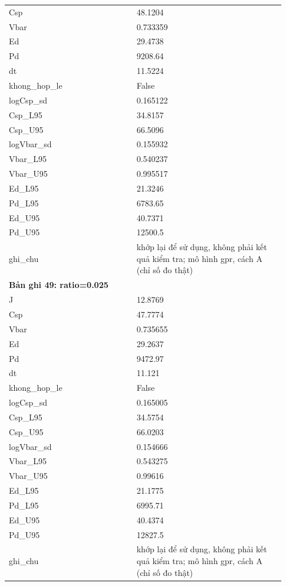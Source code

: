 \begin{longtable}{p{0.43\linewidth}p{0.50\linewidth}}
Csp & 48.1204 \\
Vbar & 0.733359 \\
Ed & 29.4738 \\
Pd & 9208.64 \\
dt & 11.5224 \\
khong\_\allowbreak hop\_\allowbreak le & False \\
logCsp\_\allowbreak sd & 0.165122 \\
Csp\_\allowbreak L95 & 34.8157 \\
Csp\_\allowbreak U95 & 66.5096 \\
logVbar\_\allowbreak sd & 0.155932 \\
Vbar\_\allowbreak L95 & 0.540237 \\
Vbar\_\allowbreak U95 & 0.995517 \\
Ed\_\allowbreak L95 & 21.3246 \\
Pd\_\allowbreak L95 & 6783.65 \\
Ed\_\allowbreak U95 & 40.7371 \\
Pd\_\allowbreak U95 & 12500.5 \\
ghi\_\allowbreak chu & khớp lại để sử dụng, không phải kết quả kiểm tra; mô hình gpr, cách A (chỉ số đo thật) \\
\midrule
\multicolumn{2}{p{0.95\linewidth}}{\textbf{Bản ghi 49: ratio=0.025}} \\
J & 12.8769 \\
Csp & 47.7774 \\
Vbar & 0.735655 \\
Ed & 29.2637 \\
Pd & 9472.97 \\
dt & 11.121 \\
khong\_\allowbreak hop\_\allowbreak le & False \\
logCsp\_\allowbreak sd & 0.165005 \\
Csp\_\allowbreak L95 & 34.5754 \\
Csp\_\allowbreak U95 & 66.0203 \\
logVbar\_\allowbreak sd & 0.154666 \\
Vbar\_\allowbreak L95 & 0.543275 \\
Vbar\_\allowbreak U95 & 0.99616 \\
Ed\_\allowbreak L95 & 21.1775 \\
Pd\_\allowbreak L95 & 6995.71 \\
Ed\_\allowbreak U95 & 40.4374 \\
Pd\_\allowbreak U95 & 12827.5 \\
ghi\_\allowbreak chu & khớp lại để sử dụng, không phải kết quả kiểm tra; mô hình gpr, cách A (chỉ số đo thật) \\

\end{longtable}
